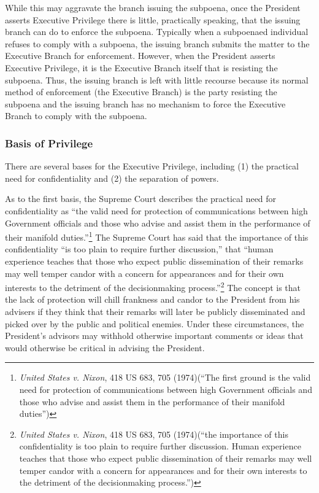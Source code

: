 While this may aggravate the branch issuing the subpoena, once the President asserts Executive Privilege there is little, practically speaking, that the issuing branch can do to enforce the subpoena.  Typically when a subpoenaed individual refuses to comply with a subpoena, the issuing branch submits the matter to the Executive Branch for enforcement.  However, when the President asserts Executive Privilege, it is the Executive Branch itself that is resisting the subpoena.  Thus, the issuing branch is left with little recourse because its normal method of enforcement (the Executive Branch) is the party resisting the subpoena and the issuing branch has no mechanism to force the Executive Branch to comply with the subpoena.

\subsubsection{Basis of Privilege}
There are several bases for the Executive Privilege, including (1) the practical need for confidentiality and (2) the separation of powers.

As to the first basis, the Supreme Court describes the practical need for confidentiality as ``the valid need for protection of communications between high Government officials and those who advise and assist them in the performance of their manifold duties.''\footnote{\textit{United States v. Nixon}, 418 US 683, 705 (1974)(``The first ground is the valid need for protection of communications between high Government officials and those who advise and assist them in the performance of their manifold duties'')}
The Supreme Court has said that the importance of this confidentiality ``is too plain to require further discussion,'' that ``human experience teaches that those who expect public dissemination of their remarks may well temper candor with a concern for appearances and for their own interests to the detriment of the decisionmaking process.''\footnote{\textit{United States v. Nixon}, 418 US 683, 705 (1974)(``the importance of this confidentiality is too plain to require further discussion. Human experience teaches that those who expect public dissemination of their remarks may well temper candor with a concern for appearances and for their own interests to the detriment of the decisionmaking process.'')}
The concept is that the lack of protection will chill frankness and candor to the President from his advisers if they think that their remarks will later be publicly disseminated and picked over by the public and political enemies.  Under these circumstances, the President's advisors may withhold otherwise important comments or ideas that would otherwise be critical in advising the President.


